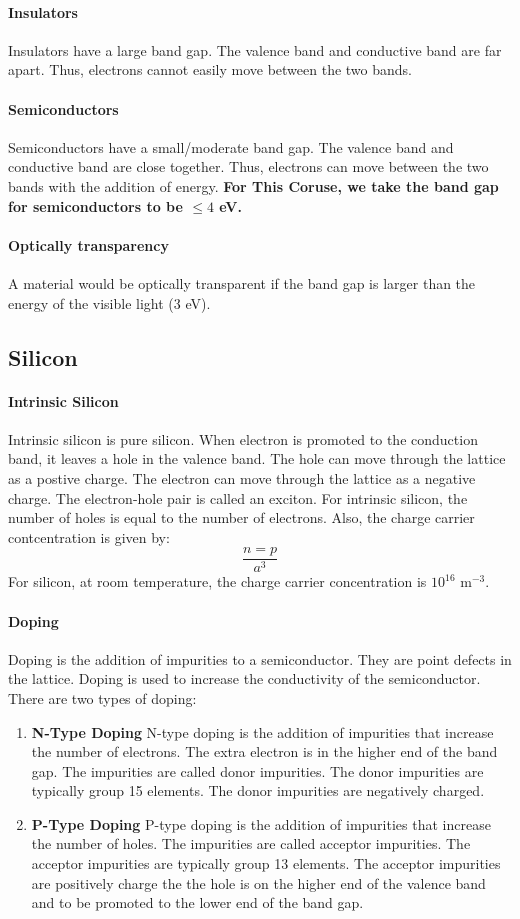 \documentclass[11pt]{report}
\begin{document}
\paragraph{Insulators} Insulators have a large band gap. The valence band and conductive band are far apart. Thus, electrons cannot easily move between the two bands.
\paragraph{Semiconductors} Semiconductors have a small/moderate band gap. The valence band and conductive band are close together. Thus, electrons can move between the two bands with the addition of energy.
\textbf{For This Coruse, we take the band gap for semiconductors to be $\le 4$ eV.}
\paragraph{Optically transparency} A material would be optically transparent if the band gap is larger than the energy of the visible light (3 eV).
\subsection{Silicon}
\paragraph{Intrinsic Silicon} Intrinsic silicon is pure silicon. When electron is promoted to the conduction band, it leaves a hole in the valence band. The hole can move through the lattice as a postive charge. The electron can move through the lattice as a negative charge. The electron-hole pair is called an exciton. For intrinsic silicon, the number of holes is equal to the number of electrons. Also, the charge carrier contcentration is given by:
\begin{equation}
    \frac{n=p}{a^3}
\end{equation}
For silicon, at room temperature, the charge carrier concentration is $10^{16}$ m$^{-3}$.
\paragraph{Doping} Doping is the addition of impurities to a semiconductor. They are point defects in the lattice. Doping is used to increase the conductivity of the semiconductor. There are two types of doping:
\begin{enumerate}
    \item \textbf{N-Type Doping} N-type doping is the addition of impurities that increase the number of electrons. The extra electron is in the higher end of the band gap. The impurities are called donor impurities. The donor impurities are typically group 15 elements. The donor impurities are negatively charged.
    \item \textbf{P-Type Doping} P-type doping is the addition of impurities that increase the number of holes. The impurities are called acceptor impurities. The acceptor impurities are typically group 13 elements. The acceptor impurities are positively charge the the hole is on the higher end of the valence band and to be promoted to the lower end of the band gap.
\end{enumerate}
\end{document}
